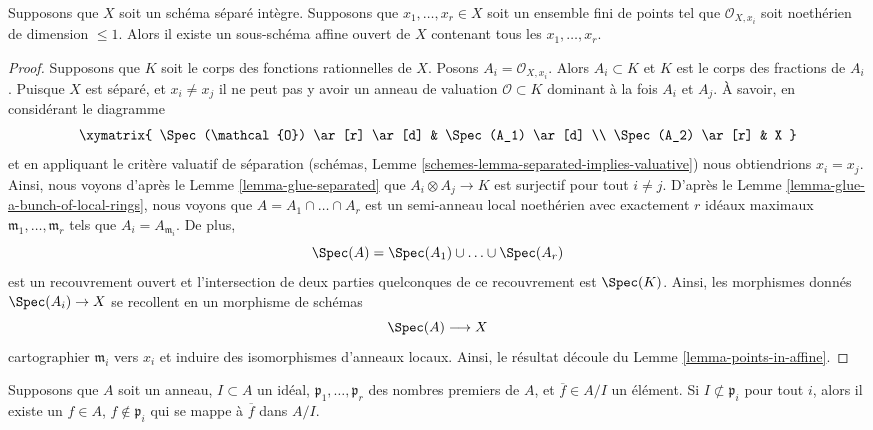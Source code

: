 \begin{lemma}
\label{lemma-finite-set-codim-1-points-in-affine}
Supposons que $X$ soit un schéma séparé intègre. Supposons que $x_1,
\ldots, x_r \in X$ soit un ensemble fini de points tel que
$\mathcal{O}_{X, x_i}$ soit noethérien de dimension $\leq 1$. Alors il
existe un sous-schéma affine ouvert de $X$ contenant tous les $x_1, \ldots, x_r$.
\end{lemma}

\begin{proof}
Supposons que $K$ soit le corps des fonctions rationnelles
de $X$. Posons $A_i = \mathcal{O}_{X, x_i}$. Alors $A_i
\subset K$ et $K$ est le corps des fractions de $A_i$.
Puisque $X$ est séparé, et $x_i \not = x_j$ il ne peut pas y
avoir un anneau de valuation $\mathcal{O} \subset K$ dominant à
la fois $A_i$ et $A_j$. À savoir, en considérant le diagramme
$$
\xymatrix{
\Spec(\mathcal{O}) \ar[r] \ar[d] & \Spec(A_1) \ar[d] \\
\Spec(A_2) \ar[r] & X
}
$$
et en appliquant le critère valuatif de séparation
(schémas, Lemme
\ref{schemes-lemma-separated-implies-valuative}) nous
obtiendrions $x_i = x_j$. Ainsi, nous voyons d'après le
Lemme \ref{lemma-glue-separated} que $A_i \otimes A_j \to K$
est surjectif pour tout $i \not = j$. D'après le Lemme
\ref{lemma-glue-a-bunch-of-local-rings}, nous voyons que $A =
A_1 \cap \ldots \cap A_r$ est un semi-anneau local
noethérien avec exactement $r$ idéaux maximaux $\mathfrak m_1,
\ldots, \mathfrak m_r$ tels que $A_i = A_{\mathfrak m_i}$. De plus,
$$
\Spec(A) = \Spec(A_1) \cup \ldots \cup \Spec(A_r)
$$
est un recouvrement ouvert et l'intersection de deux parties
quelconques de ce recouvrement est $\Spec(K)$. Ainsi, les
morphismes donnés $\Spec(A_i) \to X$ se recollent en un morphisme de schémas
$$
\Spec(A) \longrightarrow X
$$
cartographier $\mathfrak m_i$ vers $x_i$ et induire des isomorphismes
d'anneaux locaux. Ainsi, le résultat découle du Lemme \ref{lemma-points-in-affine}.
\end{proof}

\begin{lemma}
\label{lemma-extra-silly}
Supposons que $A$ soit un anneau, $I \subset A$ un idéal,
$\mathfrak p_1, \ldots, \mathfrak p_r$ des nombres premiers de
$A$, et $\overline{f} \in A/I$ un élément. Si $I \not \subset
\mathfrak p_i$ pour tout $i$, alors il existe un $f \in A$, $f
\not \in \mathfrak p_i$ qui se mappe à $\overline{f}$ dans $A/I$.
\end{lemma}

